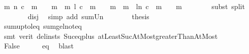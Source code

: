 \begin{isabellebody}
\ {\isachardoublequoteopen}{\isacharparenleft}{\kern0pt}{\isasymSum}m\ {\isasymin}{\isacharbraceleft}{\kern0pt}{}{\isachardot}{\kern0pt}{\isachardot}{\kern0pt}n{\isacharbraceright}{\kern0pt}{\isachardot}{\kern0pt}\ {\isacharparenleft}{\kern0pt}c\ {\isacharbang}{\kern0pt}\ {\isacharparenleft}{\kern0pt}m{\isacharminus}{\kern0pt}{}{\isacharparenright}{\kern0pt}{\isacharparenright}{\kern0pt}\ {\isacharslash}{\kern0pt}\ {}\ {\isacharcircum}{\kern0pt}\ m{\isacharparenright}{\kern0pt}\ {\isacharequal}{\kern0pt}\ {\isacharparenleft}{\kern0pt}{\isasymSum}m\ {\isacharequal}{\kern0pt}{}{\isachardot}{\kern0pt}{\isachardot}{\kern0pt}l{\isachardot}{\kern0pt}\ {\isacharparenleft}{\kern0pt}c\ {\isacharbang}{\kern0pt}\ {\isacharparenleft}{\kern0pt}m{\isacharminus}{\kern0pt}{}{\isacharparenright}{\kern0pt}{\isacharparenright}{\kern0pt}\ {\isacharslash}{\kern0pt}\ {}\ {\isacharcircum}{\kern0pt}\ m{\isacharparenright}{\kern0pt}\ {\isacharplus}{\kern0pt}\ {\isacharparenleft}{\kern0pt}{\isasymSum}m\ {\isasymin}\ {\isacharbraceleft}{\kern0pt}l{\isacharless}{\kern0pt}{\isachardot}{\kern0pt}{\isachardot}{\kern0pt}n{\isacharbraceright}{\kern0pt}{\isachardot}{\kern0pt}\ {\isacharparenleft}{\kern0pt}c\ {\isacharbang}{\kern0pt}\ {\isacharparenleft}{\kern0pt}m{\isacharminus}{\kern0pt}{}{\isacharparenright}{\kern0pt}{\isacharparenright}{\kern0pt}\ {\isacharslash}{\kern0pt}\ {}\ {\isacharcircum}{\kern0pt}\ m{\isacharparenright}{\kern0pt}{\isachardoublequoteclose}\isanewline
\ \ \ \ \ \ \isamarkupfalse%
\ {\isacharparenleft}{\kern0pt}subst\ split{\isacharparenright}{\kern0pt}\isanewline
\ \ \ \ \ \ \isamarkupfalse%
\ disj\ \isamarkupfalse%
\ {\isacharparenleft}{\kern0pt}simp\ add{\isacharcolon}{\kern0pt}\ sum{\isacharunderscore}{\kern0pt}Un{\isacharparenright}{\kern0pt}\isanewline
\ \ \ \ \isamarkupfalse%
\ \isamarkupfalse%
\ {\isacharquery}{\kern0pt}thesis\isanewline
\ \ \ \ \ \ \isamarkupfalse%
\ sum{\isacharunderscore}{\kern0pt}upto{\isacharunderscore}{\kern0pt}l{\isacharunderscore}{\kern0pt}eq\ sum{\isacharunderscore}{\kern0pt}ge{\isacharunderscore}{\kern0pt}l{\isacharunderscore}{\kern0pt}noteq\isanewline
\ \ \ \ \ \ \isamarkupfalse%
\ {\isacharparenleft}{\kern0pt}smt\ {\isacharparenleft}{\kern0pt}verit{\isacharcomma}{\kern0pt}\ del{\isacharunderscore}{\kern0pt}insts{\isacharparenright}{\kern0pt}\ Suc{\isacharunderscore}{\kern0pt}eq{\isacharunderscore}{\kern0pt}plus{}\ atLeastSucAtMost{\isacharunderscore}{\kern0pt}greaterThanAtMost{\isacharparenright}{\kern0pt}\isanewline
\ \ \isamarkupfalse%
\isanewline
\ \ \isamarkupfalse%
\ \isamarkupfalse%
\ False\isanewline
\ \ \ \ \isamarkupfalse%
\ eq\ \isamarkupfalse%
\ blast\isanewline
{}\isamarkupfalse%
%
\endisatagproof
{\isafoldproof}%
%
\isadelimproof
\isanewline
%
\endisadelimproof
\isanewline
%
\isadelimtheory
\isanewline
%
\endisadelimtheory
%
\isatagtheory
{}\isamarkupfalse%
%
\endisatagtheory
{\isafoldtheory}%
%
\isadelimtheory
%
\endisadelimtheory
%
\end{isabellebody}%
